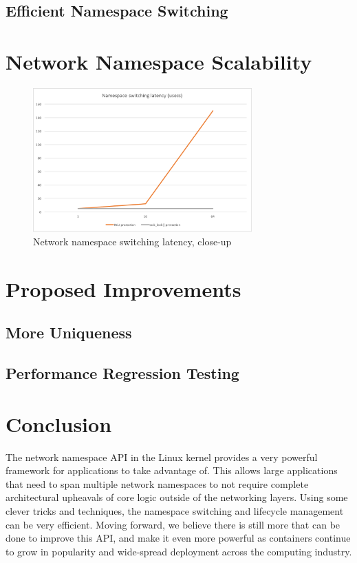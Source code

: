 \documentclass[letterpaper]{article}
\begin{document}
\subsection{Efficient Namespace Switching}

\section{Network Namespace Scalability}

\begin{figure}[h]
\includegraphics[width=3.31in]{close-up-latency.png}
\caption{Network namespace switching latency, close-up}
\label{close-latency}
\end{figure}

\section{Proposed Improvements}

\subsection{More Uniqueness}

\subsection{Performance Regression Testing}

\section{Conclusion}
The network namespace API in the Linux kernel provides a very powerful framework for applications to take advantage of. This allows large applications that need to span multiple network namespaces to not require complete architectural upheavals of core logic outside of the networking layers. Using some clever tricks and techniques, the namespace switching and lifecycle management can be very efficient. Moving forward, we believe there is still more that can be done to improve this API, and make it even more powerful as containers continue to grow in popularity and wide-spread deployment across the computing industry.
\end{document}
